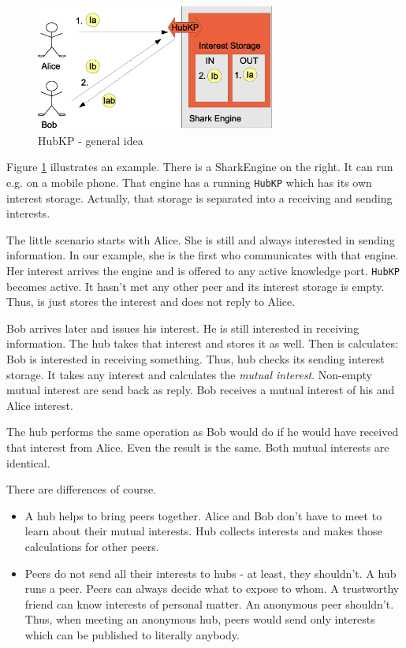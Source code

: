 {\begin{figure}[t]
\centering
\includegraphics[width=0.70\textwidth]{hubKP.eps}
\caption{HubKP - general idea}
\label{fig:hubKP}
\end{figure}

Figure \ref{fig:hubKP} illustrates an example. There is a SharkEngine on the right. It can run e.g. on a mobile phone. That engine has a running {\tt HubKP} which has its own interest storage. Actually, that storage is separated into a receiving and sending interests.

The little scenario starts with Alice. She is still and always interested in sending information. In our example, she is the first who communicates with that engine. Her interest arrives the engine and is offered to any active knowledge port. {\tt HubKP} becomes active. It hasn't met any other peer and its interest storage is empty. Thus, is just stores the interest and does not reply to Alice.

Bob arrives later and issues his interest. He is still interested in receiving information. The hub takes that interest and stores it as well. Then is calculates: Bob is interested in receiving something. Thus, hub checks its sending interest storage. It takes any interest and calculates the {\it mutual interest}. Non-empty mutual interest are send back as reply. Bob receives a mutual interest of his and Alice interest.

The hub performs the same operation as Bob would do if he would have received that interest from Alice. Even the result is the same. Both mutual interests are identical.

There are differences of course.

\begin{itemize}
\item
A hub helps to bring peers together. Alice and Bob don't have to meet to learn about their mutual interests. Hub collects interests and makes those calculations for other peers.
\item
Peers do not send all their interests to hubs - at least, they shouldn't. A hub runs a peer. Peers can always decide what to expose to whom. A trustworthy friend can know interests of personal matter. An anonymous peer shouldn't.
Thus, when meeting an anonymous hub, peers would send only interests which can be published to literally anybody.
\end{itemize}

}
